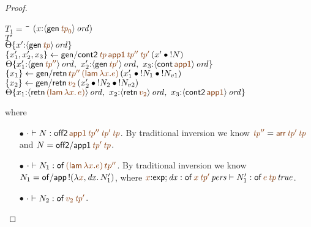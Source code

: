 \begin{proof}
\begin{description}
\begin{tabbing}
$T_1 = ~$ \= \qquad \= $(x{:}\istrue{\susp{{\sf gen}\,\lf{{\it tp}_0}}})$
\\
\>$T'$
\\
\>\>$\tackon{\Theta}{x'{:}\istrue{\susp{{\sf gen}\,\lf{{\it tp}}}}}$
\\
\>$\trstep{x_1', x_2', x_3}
     {{\sf gen/cont2}\,\lf{{\it tp}}\,\lf{\sf app1}\,
         \lf{{\it tp}''}\,\lf{{\it tp}'}\,
         (\tfuser{x'}{\tbangr{N}})}$
\\ %
\>\>$\tackon{\Theta}
     {x_1'{:}\istrue{\susp{{\sf gen}\,\lf{{\it tp}''}}}, ~
      x_2'{:}\istrue{\susp{{\sf gen}\,\lf{{\it tp}'}}}, ~
      x_3{:}\istrue{\susp{{\sf cont}\,\lf{\sf app1}}}}$
\\
\>$\trstep{x_1}
     {{\sf gen/retn}\,\lf{tp''}\,\lf{({\sf lam}\,\lambda x.e)}\,}
         (\tfuser{x_1'}{\tfuser{\tbangr{N_1}}{\tbangr{N_{v1}}}})$
\\
\>$\trstep{x_2}
     {{\sf gen/retn}\,\lf{v_2}\,(\tfuser{x_2'}{\tfuser{\tbangr{N_2}}{\tbangr{N_{v2}}}})}$
\\
\>\>$\tackon{\Theta}{x_1{:}\istrue{\susp{{\sf retn}\,\lf{({\sf lam}\,\lambda x.\,e)}}}, ~
                   x_2{:}\istrue{\susp{{\sf retn}\,\lf{v_2}}}, ~
                   x_3{:}\istrue{\susp{{\sf cont2}\,\lf{\sf app1}}}}$
\end{tabbing}
where
\begin{itemize}
\item[$\bullet$] $\cdot \vdash N : {\sf off2}\,\lf{\sf app1}\,\lf{{\it
      tp}''}\,\lf{{\it tp}'}\,\lf{{\it tp}}$.  By traditional
  inversion we know $\lf{\it{tp}''} = \lf{{\sf arr}\,{\it tp}'\,{\it
      tp}}$ and $N = {\sf off2/app1}\,\lf{{\it tp}'}\,\lf{{\it tp}}$.
\item[$\bullet$] $\cdot \vdash N_1 : {\sf of}\,\lf{({\sf lam}\,\lambda
    x.e)}\,\lf{tp''}$. By traditional inversion we know $N_1 = {\sf
    of/app}\,\tbangr{(\lambda \lf{x},{\it dx}.\,N_1')}$, where
  $\lf{x}{:}{\sf exp}; {\it dx} : \ispers{{\sf of}\,\lf{x}\,\lf{\it
      tp'}} \vdash N_1' : \isconc{{\sf of}\,\lf{e}\,\lf{\it
        tp}}$.
\item[$\bullet$] $\cdot \vdash N_2 : {\sf of}\,\lf{v_2}\,\lf{{\it tp}'}$.
\end{itemize}


\end{description}
\end{proof}
